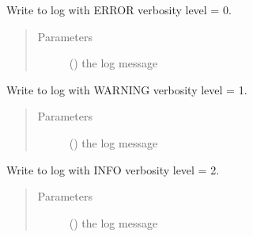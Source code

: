 \documentclass[letterpaper,10pt,english]{sphinxmanual}
\begin{document}
\begin{fulllineitems}
\label{\detokenize{fsm:logE}}
Write to log with ERROR verbosity level = 0.
\begin{quote}\begin{description}
\item[{Parameters}] \leavevmode
{} () \textendash{} the log message

\end{description}\end{quote}

\end{fulllineitems}


\begin{fulllineitems}
\label{\detokenize{fsm:logW}}
Write to log with WARNING verbosity level = 1.
\begin{quote}\begin{description}
\item[{Parameters}] \leavevmode
{} () \textendash{} the log message

\end{description}\end{quote}

\end{fulllineitems}


\begin{fulllineitems}
\label{\detokenize{fsm:logI}}
Write to log with INFO verbosity level = 2.
\begin{quote}\begin{description}
\item[{Parameters}] \leavevmode
{} () \textendash{} the log message

\end{description}\end{quote}

\end{fulllineitems}
\end{document}
